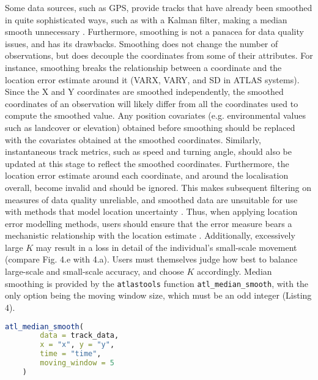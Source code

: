 \begin{refsection}
    Some data sources, such as GPS, provide tracks that have already been smoothed in quite sophisticated ways, such as with a Kalman filter, making a median smooth unnecessary \citep{kaplan2005}.
    Furthermore, smoothing is not a panacea for data quality issues, and has its drawbacks.
    Smoothing does not change the number of observations, but does decouple the coordinates from some of their attributes.
    For instance, smoothing breaks the relationship between a coordinate and the location error estimate around it (VARX, VARY, and SD in ATLAS systems).
    Since the X and Y coordinates are smoothed independently, the smoothed coordinates of an observation will likely differ from all the coordinates used to compute the smoothed value.
    Any position covariates (e.g. environmental values such as landcover or elevation) obtained before smoothing should be replaced with the covariates obtained at the smoothed coordinates.
    Similarly, instantaneous track metrics, such as speed and turning angle, should also be updated at this stage to reflect the smoothed coordinates.
    Furthermore, the location error estimate around each coordinate, and around the localisation overall, become invalid and should be ignored.
    This makes subsequent filtering on measures of data quality unreliable, and smoothed data are unsuitable for use with methods that model location uncertainty \citep{noonan2019, fleming2014a, fleming2020, calabrese2016}.
    Thus, when applying location error modelling methods, users should ensure that the error measure bears a mechanistic relationship with the location estimate \citep[see][ for more details]{fleming2020, noonan2019}.
    Additionally, excessively large $K$ may result in a loss in detail of the individual's small-scale movement (compare Fig. 4.e with 4.a).
    Users must themselves judge how best to balance large-scale and small-scale accuracy, and choose $K$ accordingly.
    Median smoothing is provided by the \texttt{atlastools} function \texttt{atl\_median\_smooth}, with the only option being the moving window size, which must be an odd integer (Listing 4).

    \begin{lstlisting}[float, language=R, style=customR, caption = {
        Median smoothing a movement track using the function \texttt{atl\_median\_smooth} function with a moving window \textit{K = 5}. 
        Larger values of $K$ yield smoother tracks, but $K$ should always be some orders of magnitude lower than the number of observations.}]
    atl_median_smooth(
        data = track_data,
        x = "x", y = "y",
        time = "time",
        moving_window = 5
    )
    \end{lstlisting}


\end{refsection}
